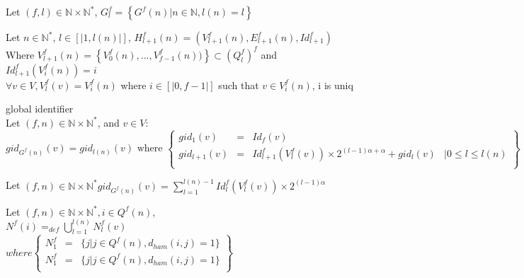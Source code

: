 \begin{definition} Let $(f,l) \in \mathbb{N} \times \mathbb{N}^{*}$, $G_{l}^{f} = \left\{ G^{f}(n) |n \in \mathbb{N}, l(n) = l \right\}$\\
\end{definition}

\begin{definition} Let $n \in \mathbb{N}^{*}$, $l \in [|1, l(n)|]$, 
$H_{l+1}^{f}(n) = (V_{l+1}^{f}(n), E_{l+1}^{f}(n), Id_{l+1}^{f})$\\
Where $V_{l+1}^{f}(n) = \left\{V_{0}^{f}(n), ..., V_{f-1}^{f}(n)) \right\} \subset (Q_{l}^{f})^{f} $ and $Id_{l+1}^{f}(V_{i}^{f}(n)	)=i$\\
$\forall v \in V, V_{l}^{f}(v) = V_{i}^{f}(n)$ where $i \in [|0,f-1|]$ such that $v \in V_{i}^{f}(n)$, i is uniq
\end{definition}

\begin{definition} global identifier\\
  Let $(f,n) \in \mathbb{N} \times \mathbb{N}^{*}$, and $v \in V$:\\
      $gid_{G^{f}(n)}(v) = gid_{l(n)}(v) \text{ where } \left\{ 
	\begin{array}{llll}
	 gid_{1}(v) & = & Id_{f}(v) & \\
	 gid_{l+1}(v) & = & Id_{l+1}^{f}(V_{l}^{f}(v)) \times 2^{(l-1)\alpha+\alpha} + gid_{l}(v) & | 0 \leq l \le l(n)\\
	\end{array}\right\}$\\  
\end{definition}

\begin{prop}
Let $(f,n) \in \mathbb{N} \times \mathbb{N}^{*} gid_{G^{f}(n)}(v) =\sum_{l=1}^{l(n)-1} Id_{l}^{f}(V_{l}^{f}(v)) \times 2^{(l-1)\alpha}$
\end{prop}


\begin{definition}[ neighbourhood] Let $(f,n) \in \mathbb{N} \times \mathbb{N}^{*}, i \in Q^{f}(n)$,\\
$N^{f}(i) =_{def}\bigcup_{l=1}^{l(n)}{N_{l}^{f}(v)}$\\
$where \left\{
\begin{array}{lll}
 N_{1}^{f} & = &\{j|j\in Q^{f}(n), d_{ham}(i,j)=1\}\\
 N_{1}^{f} & = &\{j|j\in Q^{f}(n), d_{ham}(i,j)=1\}\\
\end{array}\right\}$

\end{definition}


